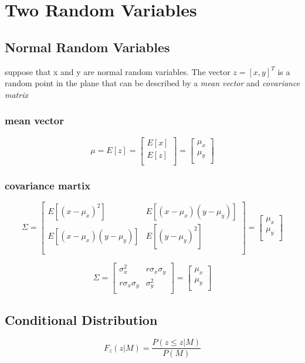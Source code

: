 
\section{Two Random Variables}
\subsection{Normal Random Variables}
suppose that x and y are normal random variables. The vector $z=[x,y]^{T}$ is a random point in the plane that can be described by a {\color{red}\emph{mean vector}} and {\color{red}\emph{covariance matrix}}

\subsubsection{{\color{red} mean vector}}
\[
\mu =E[z]=
\left [ \begin{array}{c}
E[x] \\
E[z] \\
\end{array}
\right ] =
\left [ \begin{array}{c}
\mu_{x} \\
\mu_{y} \\
\end{array}
\right]
\]

\subsubsection{{\color{red} covariance martix}}

 \[
\Sigma =
\left [ \begin{array}{cc}
E[(x-\mu_{x})^{2}] & E[(x-\mu_{x})(y-\mu_{y})]\\
E[(x-\mu_{x})(y-\mu_{y})] & E[(y-\mu_{y})^{2}]\\
\end{array}
\right ] =
\left [ \begin{array}{c}
\mu_{x} \\
\mu_{y} \\
\end{array}
\right]
\]
 
\[
\Sigma =
\left [ \begin{array}{cc}
\sigma_{x}^{2} & r\sigma_{x}\sigma_{y}\\
r\sigma_{x}\sigma_{y} & \sigma_{y}^{2}\\
\end{array}
\right ] =
\left [ \begin{array}{c}
\mu_{x} \\
\mu_{y} \\
\end{array}
\right]
\]
 

\subsection{Conditional Distribution}

\begin{equation*}
       F_{z}(z|M)=\frac{P(z\leq z| M)}{P(M)}
\end{equation*}

